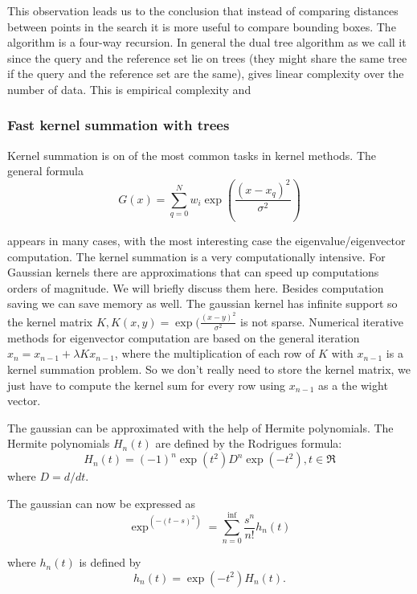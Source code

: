 \documentclass[12pt,letterpaper,doublespaced,ETD,dvips,proposal]{gtthesis}
\begin{document}
\begin{Body}
This observation leads us to the conclusion that instead of
comparing distances between points in the search it is more useful
to compare bounding boxes. The algorithm is  a four-way recursion.
In general the dual tree algorithm as we call it since the query and
the reference set lie on trees (they might share the same tree if
the query and the reference set are the same), gives linear
complexity over the number of data. This is empirical complexity and
\subsubsection{Fast kernel summation with trees}
Kernel summation is on of the most common tasks in kernel methods.
The general formula
\begin{equation}
\label{kernel_sum}
  G(x)=\sum_{q=0}^{N} w_i\exp(\frac{(x-x_q)^2}{\sigma^2})
\end{equation}

appears in many cases, with the most interesting case the
eigenvalue/eigenvector computation. The kernel summation is a very
computationally intensive. For Gaussian kernels there are
approximations that can speed up computations orders of magnitude.
We will briefly discuss them here. Besides computation saving we can
save memory as well. The gaussian kernel has infinite support so the
kernel matrix $K, K(x,y)=\exp(\frac{(x-y)^2}{\sigma^2}$ is not
sparse. Numerical iterative methods for eigenvector computation are
based on the general iteration $x_n=x_{n-1}+\lambda Kx_{n-1}$, where
the multiplication of each row of $K$ with $x_{n-1}$ is a kernel
summation problem. So we don't really need to store the kernel
matrix, we just have to compute the kernel sum for every row using
$x_{n-1}$ as a the wight vector.

The gaussian can be approximated with the help of Hermite
polynomials. The Hermite polynomials $H_n(t)$ are defined by the
Rodrigues formula:
\begin{equation}
  H_n(t)=(-1)^n\exp(t^2)D^n\exp(-t^2), t\in \Re
\end{equation}
where $D=d/dt$.

The gaussian can now be expressed as
\begin{equation}
\exp^(-(t-s)^2)=\sum_{n=0}^{\inf}\frac{s^n}{n!}h_n(t)
\end{equation}

where $h_n(t)$ is defined by
\begin{equation}
h_n(t)=\exp(-t^2)H_n(t).
\end{equation}



\end{Body}
\end{document}
